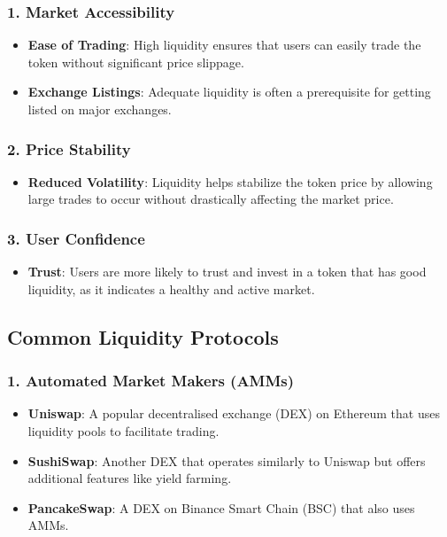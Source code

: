\documentclass{tufte-handout}
\begin{document}
\subsubsection*{1. Market Accessibility}
\begin{itemize}
    \item \textbf{Ease of Trading}: High liquidity ensures that users can easily trade the token without significant price slippage.
    \item \textbf{Exchange Listings}: Adequate liquidity is often a prerequisite for getting listed on major exchanges.
\end{itemize}

\subsubsection*{2. Price Stability}
\begin{itemize}
    \item \textbf{Reduced Volatility}: Liquidity helps stabilize the token price by allowing large trades to occur without drastically affecting the market price.
\end{itemize}

\subsubsection*{3. User Confidence}
\begin{itemize}
    \item \textbf{Trust}: Users are more likely to trust and invest in a token that has good liquidity, as it indicates a healthy and active market.
\end{itemize}

\subsection*{Common Liquidity Protocols}

\subsubsection*{1. Automated Market Makers (AMMs)}
\begin{itemize}
    \item \textbf{Uniswap}: A popular decentralised exchange (DEX) on Ethereum that uses liquidity pools to facilitate trading.
    \item \textbf{SushiSwap}: Another DEX that operates similarly to Uniswap but offers additional features like yield farming.
    \item \textbf{PancakeSwap}: A DEX on Binance Smart Chain (BSC) that also uses AMMs.
\end{itemize}
\end{document}
